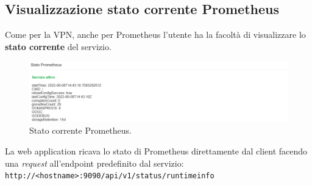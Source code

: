 \subsection{Visualizzazione stato corrente Prometheus}

Come per la VPN, anche per Prometheus l'utente ha la facoltà di visualizzare lo \textbf{stato corrente} del servizio.

\begin{figure}[H]
    \begin{center}
    \includegraphics[width=\textwidth]{images/prometheus-status.png}
    \caption{Stato corrente Prometheus.}
    \end{center}
\end{figure}

La web application ricava lo stato di Prometheus direttamente dal client facendo una \emph{request} all'endpoint predefinito dal servizio:\\
\texttt{http://<hostname>:9090/api/v1/status/runtimeinfo}